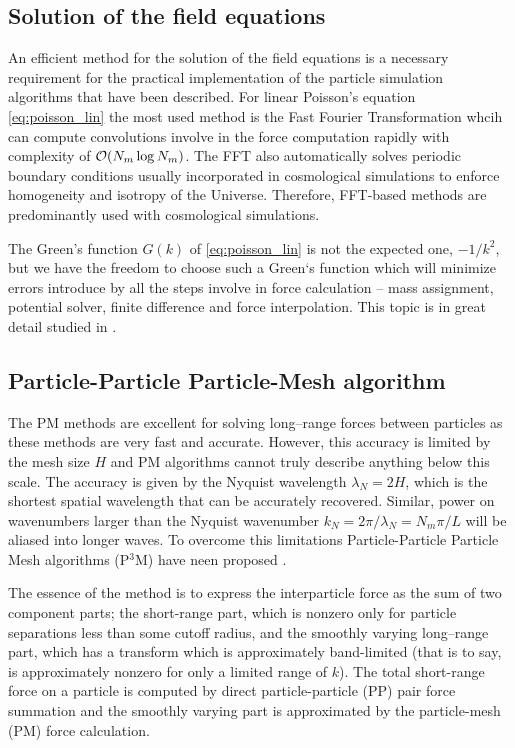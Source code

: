 \subsection{Solution of the field equations}
An efficient method for the solution of the field equations is a necessary requirement for the practical implementation of the particle simulation algorithms that have been described. For linear Poisson’s equation \eqref{eq:poisson_lin} the most used method is the Fast Fourier Transformation whcih can compute convolutions involve in the force computation rapidly with complexity of $\mathcal{O}(N_m\log N_m)$. The FFT also automatically solves periodic boundary conditions usually incorporated in cosmological simulations to enforce homogeneity and isotropy of the Universe. Therefore, FFT-based methods are predominantly used with cosmological simulations.

The Green's function $G(k)$ of \eqref{eq:poisson_lin} is not the expected one, $-1/k^2$, but we have the freedom to choose such a Green`s function which will minimize errors introduce by all the steps involve in force calculation -- mass assignment, potential solver, finite difference and force interpolation. This topic is in great detail studied in \textcite{Hockney:1988:CSU:62815}.
\subsection{Particle-Particle Particle-Mesh algorithm}
The PM methods are excellent for solving long--range forces between particles as these methods are very fast and accurate. However, this accuracy is limited by the mesh size $H$ and PM algorithms cannot truly describe anything below this scale. The accuracy is given by the Nyquist wavelength $\lambda_N=2H$, which is the shortest spatial wavelength that can be accurately recovered. Similar, power on wavenumbers larger than the Nyquist wavenumber $k_N=2\pi/\lambda_N=N_m\pi/L$ will be aliased into longer waves. To overcome this limitations Particle-Particle Particle Mesh algorithms (P$^3$M) have neen proposed \textcite{hockney_10000_1973}.

The essence of the method is to express the interparticle force as the sum of two component parts; the short-range part, which is nonzero only for particle separations less than some cutoff radius, and the smoothly varying long--range part, which has a transform which is approximately band-limited (that is to say, is approximately nonzero for only a limited range of $k$). The total short-range force on a particle is computed by direct particle-particle (PP) pair force summation and the smoothly varying part is approximated by the particle-mesh (PM) force calculation.

